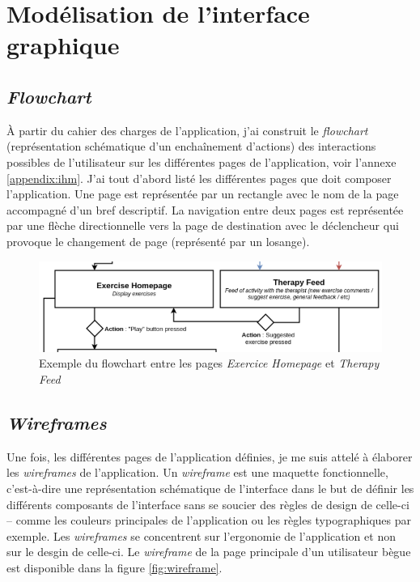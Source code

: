 \section{Modélisation de l'interface graphique}

\subsection{\textit{Flowchart}}

À partir du cahier des charges de l'application, j'ai construit le \textit{flowchart} (représentation schématique d'un enchaînement d'actions) des interactions possibles de l'utilisateur sur les différentes pages de l'application, voir l'annexe \ref{appendix:ihm}. J'ai tout d'abord listé les différentes pages que doit composer l'application. Une page est représentée par un rectangle avec le nom de la page accompagné d'un bref descriptif. La navigation entre deux pages est représentée par une flèche directionnelle vers la page de destination avec le déclencheur qui provoque le changement de page (représenté par un losange).

\begin{figure}[H]
  \includegraphics[width=.8\linewidth]{content/imgs/ihm_ex.png}
  \caption{Exemple du flowchart entre les pages \textit{Exercice Homepage} et \textit{Therapy Feed}}
  \label{fig:flowchart}
\end{figure}


\subsection{\textit{Wireframes}}

Une fois, les différentes pages de l'application définies, je me suis attelé à élaborer les \textit{wireframes} de l'application. Un \textit{wireframe} est une maquette fonctionnelle, c'est-à-dire une représentation schématique de l'interface dans le but de définir les différents composants de l'interface sans se soucier des règles de design de celle-ci -- comme les couleurs principales de l'application ou les règles typographiques par exemple. Les \textit{wireframes} se concentrent sur l'ergonomie de l'application et non sur le desgin de celle-ci. Le \textit{wireframe} de la page principale d'un utilisateur bègue est disponible dans la figure \ref{fig:wireframe}.


